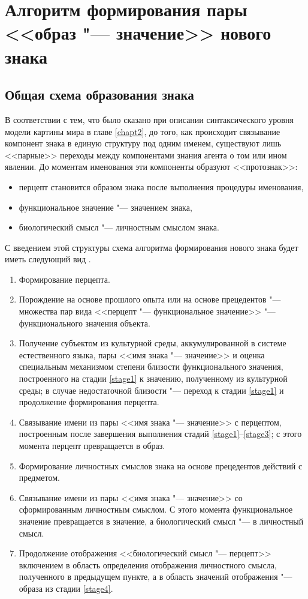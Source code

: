 \section{Алгоритм формирования пары <<образ "--- значение>> нового знака} \label{sect3_3}

\subsection{Общая схема образования знака}

В соответствии с тем, что было сказано при описании синтаксического уровня модели картины мира в главе \ref{chapt2}, до того, как происходит связывание компонент знака в единую структуру под одним именем, существуют лишь <<парные>> переходы между компонентами знания агента о том или ином явлении. До моментам именования эти компоненты образуют <<протознак>>:
\begin{itemize}
	\item перцепт становится образом знака после выполнения процедуры именования,
	\item функциональное значение "--- значением знака,
	\item биологический смысл "--- личностным смыслом знака.
	\end{itemize}
	
С введением этой структуры схема алгоритма формирования нового знака будет иметь следующий вид \cite{PanovA2014a}.

\begin{enumerate}
	\label{new_sign_alg}
	\renewcommand\labelenumi{\theenumi .}
	\item\label{stage1} Формирование перцепта.
	\item\label{stage2} Порождение на основе прошлого опыта или на основе прецедентов "--- множества пар вида <<перцепт "--- функциональное значение>> "--- функционального значения объекта.
	\item\label{stage3} Получение субъектом из культурной среды, аккумулированной в системе естественного языка, пары <<имя знака "--- значение>> и оценка специальным механизмом степени близости функционального значения, построенного на стадии \ref{stage1} к значению, полученному из культурной среды; в случае недостаточной близости "--- переход к стадии \ref{stage1} и продолжение формирования перцепта.
	\item\label{stage4} Связывание имени из пары <<имя знака "--- значение>> с перцептом, построенным после завершения выполнения стадий \ref{stage1}--\ref{stage3}; с этого момента перцепт превращается в образ.
	\item Формирование личностных смыслов знака на основе прецедентов действий с предметом.
	\item Связывание имени из пары <<имя знака "--- значение>> со сформированным личностным смыслом. С этого момента функциональное значение превращается в значение, а биологический смысл "--- в личностный смысл.
	\item Продолжение отображения <<биологический смысл "--- перцепт>> включением в область определения отображения личностного смысла, полученного в предыдущем пункте, а в область значений отображения "--- образа из стадии \ref{stage4}.
\end{enumerate}

